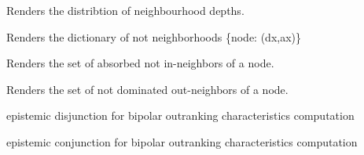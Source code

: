 \documentclass[letterpaper,10pt,english]{sphinxmanual}
\begin{document}
\begin{fulllineitems}

\begin{fulllineitems}
\label{techDoc:digraphs.Digraph.neighbourhoodDepthDistribution}
Renders the distribtion of neighbourhood depths.

\end{fulllineitems}


\begin{fulllineitems}
\label{techDoc:digraphs.Digraph.notGammaSets}
Renders the dictionary of not neighborhoods \{node: (dx,ax)\}

\end{fulllineitems}


\begin{fulllineitems}
\label{techDoc:digraphs.Digraph.notaneighbors}
Renders the set of absorbed not in-neighbors of a node.

\end{fulllineitems}


\begin{fulllineitems}
\label{techDoc:digraphs.Digraph.notdneighbors}
Renders the set of not dominated out-neighbors of a node.

\end{fulllineitems}


\begin{fulllineitems}
\label{techDoc:digraphs.Digraph.omax}
epistemic disjunction for bipolar outranking characteristics
computation

\end{fulllineitems}


\begin{fulllineitems}
\label{techDoc:digraphs.Digraph.omin}
epistemic conjunction for bipolar outranking characteristics
computation


\end{fulllineitems}
\end{fulllineitems}
\end{document}
